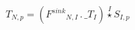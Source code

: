 \documentclass[border=2pt]{standalone}
\begin{document}
${T}{_{N, p}}=\left({{F^{sink}}}{_{N, I}} \, . \, {\_T}{_{I}}\right) \stackrel{I}{\star} {{S}}{_{I, p}}$
\end{document}
